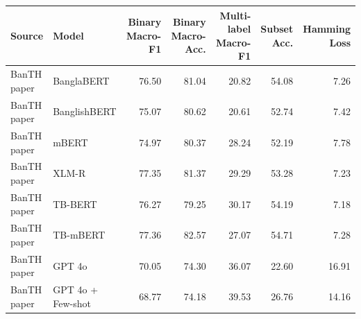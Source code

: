 \begin{tabular}{llrrrrr}
\toprule
Source & Model & Binary Macro-F1 & Binary Macro-Acc. & Multi-label Macro-F1 & Subset Acc. & Hamming Loss \\
\midrule
BanTH paper & BanglaBERT & 76.50 & 81.04 & 20.82 & 54.08 & 7.26 \\
BanTH paper & BanglishBERT & 75.07 & 80.62 & 20.61 & 52.74 & 7.42 \\
BanTH paper & mBERT & 74.97 & 80.37 & 28.24 & 52.19 & 7.78 \\
BanTH paper & XLM-R & 77.35 & 81.37 & 29.29 & 53.28 & 7.23 \\
BanTH paper & TB-BERT & 76.27 & 79.25 & 30.17 & 54.19 & 7.18 \\
BanTH paper & TB-mBERT & 77.36 & 82.57 & 27.07 & 54.71 & 7.28 \\
BanTH paper & GPT 4o & 70.05 & 74.30 & 36.07 & 22.60 & 16.91 \\
BanTH paper & GPT 4o + Few-shot & 68.77 & 74.18 & 39.53 & 26.76 & 14.16 \\
\bottomrule
\end{tabular}
